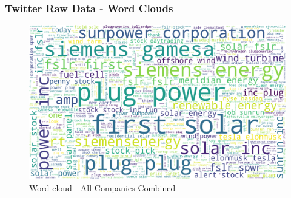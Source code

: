 \documentclass[sigconf, nonacm]{acmart}
\begin{document}
\subsubsection{Twitter Raw Data - Word Clouds}
\begin{figure}[H]
  \centering
  \includegraphics[width=1\linewidth]{images/complete_wordcloud2.png}
  \caption{Word cloud - All Companies Combined}
\end{figure}
\end{document}
